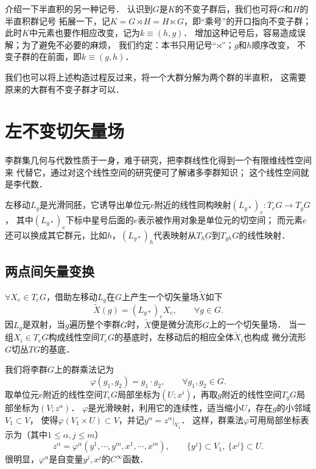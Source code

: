 介绍一下半直积的另一种记号．
认识到$G$是$K$的不变子群后，我们也可将$G$和$H$的{\kaishu  半直积群}记号
拓展一下，记$K=G  \rtimes H =H \ltimes G$，即“乘号”的开口指向不变子群；
此时$K$中元素也要作相应改变，记为$k\equiv (h,g)$．
增加这种记号后，容易造成误解；为了避免不必要的麻烦，
我们约定：本书只用记号“$\rtimes$”；$g$和$h$顺序改变，
不变子群的在前面，即$k\equiv (g,h)$．



我们也可以将上述构造过程反过来，将一个大群分解为两个群的半直积，
这需要原来的大群有不变子群才可以．








\section{左不变切矢量场}\label{chlg:sec_Left-Invariant-Vector-Fields}
李群集几何与代数性质于一身，难于研究，把李群线性化得到一个有限维线性空间来
代替它，通过对这个线性空间的研究便可了解诸多李群知识；
这个线性空间就是李代数．

左移动$L_{g}$是光滑同胚，它诱导出单位元$e$附近的线性同构映射$(L_{g*})_e:T_eG\to T_g G$，
其中$(L_{g*})_e$下标中星号后面的$e$表示被作用对象是单位元的切空间；
而元素$e$还可以换成其它群元，比如$h$，$(L_{g*})_h$代表映射从$T_hG$到$T_{gh} G$的线性映射．


\subsection{两点间矢量变换}
$\forall X_e \in T_e G$，借助左移动$L_g$在$G$上产生一个切矢量场$\widetilde{X}$如下
\begin{equation}
    \widetilde{X}(g) = (L_{g*})_e X_e , \qquad \forall g\in G.
\end{equation}
因$L_g$是双射，当$g$遍历整个李群$G$时，$\widetilde{X}$便是微分流形$G$上的一个切矢量场．
当一组$X_i\in T_eG$构成线性空间$T_eG$的基底时，左移动后的相应全体$\widetilde{X}_i$也构成
微分流形$G$切丛$TG$的基底．

我们将李群$G$上的群乘法记为
\begin{equation}
    \varphi(g_1,g_2)=g_1\cdot g_2 , \qquad \forall g_1 , g_2 \in G.
\end{equation}
取单位元$e$附近的线性空间$T_eG$局部坐标为$(U;x^i)$，再取$g$附近的线性空间$T_gG$局部坐标为$(V;z^\alpha)$．
$\varphi$是光滑映射，利用它的连续性，适当缩小$U$，存在$g$的小邻域$V_1\subset V$，
使得$\varphi(V_1\times U)\subset V$，并记$y^\alpha=z^\alpha|_{V_1}$．
这样，群乘法$\varphi$可用局部坐标表示为（其中$ 1\leqslant \alpha,j \leqslant m$）
\begin{equation}\label{chlg:eqn_z=xy}
    z^\alpha=\varphi^\alpha(y^1,\cdots,y^m, x^1,\cdots,x^m),\qquad
    \{y^j\}\subset V_1,\  \{x^j\}\subset U. 
\end{equation}
很明显，$\varphi^\alpha$是自变量$y^j,x^j$的$C^\infty$函数．

